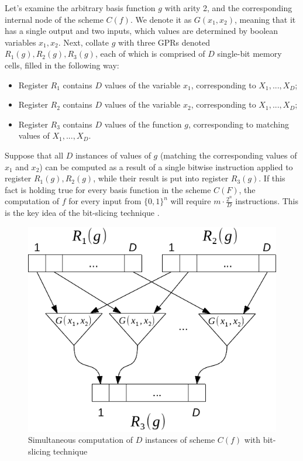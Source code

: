 \documentclass[runningheads,a4paper]{llncs}[2015/06/24]
\begin{document}
Let's examine the arbitrary basis function $g$ with arity 2, and the
corresponding internal node of the scheme $C(f)$. We denote it as $G(x_1,x_2)$,
meaning that it has a single output and two inputs, which values are determined
by boolean variables $x_1,x_2$. Next, collate $g$ with three GPRs denoted
$R_1(g),R_2(g),R_3(g)$, each of which is comprised of $D$ single-bit memory
cells, filled in the following way: 
\begin{itemize} 
\item Register $R_1$ contains $D$ values of the variable $x_1$, corresponding
 to $X_1,...,X_D$; 
\item Register $R_2$ contains $D$ values of the variable $x_2$, corresponding
 to $X_1,...,X_D$;
\item Register $R_3$ contains $D$ values of the function $g$, corresponding to
 matching values of $X_1,...,X_D$.
\end{itemize}
Suppose that all $D$ instances of values of $g$ (matching the corresponding
values of $x_1$ and $x_2$) can be computed as a result of a single bitwise
instruction applied to register $R_1(g),R_2(g)$, while their result is put into
register $R_3(g)$.  If this fact is holding true for every basis function in
the scheme $C(F)$, the computation of $f$ for every input from $\{0,1\}^n$ will
require $m\cdot\frac{2^n}{D}$ instructions. This is the key idea of the
bit-slicing technique \cite{fig:bitsl}.


\begin{figure} \includegraphics[width=\linewidth]{./bitslice.png}
	\caption{Simultaneous computation of $D$ instances of scheme $C(f)$ with
	bit-slicing technique} \label{fig:a51gen} 
\end{figure}
\end{document}
